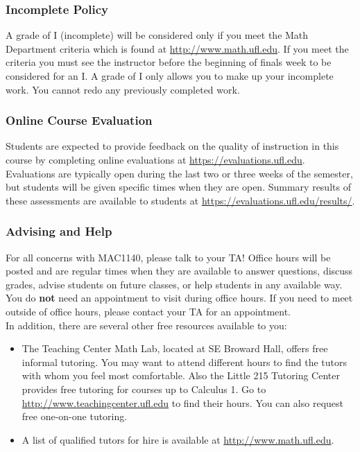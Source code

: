 \documentclass{ximera}
\begin{document}
\subsubsection*{Incomplete Policy}
    A grade of I (incomplete) will be considered only if you meet the Math Department criteria which is found at \url{http://www.math.ufl.edu}.  If you meet the criteria you must see the instructor before the beginning of finals week to be considered for an I.  A grade of I only allows you to make up your incomplete work. You cannot redo any previously completed work.


\subsubsection*{Online Course Evaluation}
    Students are expected to provide feedback on the quality of instruction in this course by completing online evaluations at \url{https://evaluations.ufl.edu}. Evaluations are typically open during the last two or three weeks of the semester, but students will be given specific times when they are open. Summary results of these assessments are available to students at \url{https://evaluations.ufl.edu/results/}.

\subsubsection*{Advising and Help}  %
    For all concerns with MAC1140, please talk to your TA!  Office hours will be posted and are regular times when they are available to answer questions, discuss grades, advise students on future classes, or help students in any available way. You do \textbf{not} need an appointment to visit during office hours. If you need to meet outside of office hours, please contact your TA for an appointment. \\


    \noindent In addition, there are several other free resources available to you:
    \begin{itemize}
        \item The Teaching Center Math Lab, located at SE Broward Hall, offers free informal tutoring. You may want to attend different hours to find the tutors with whom you feel most comfortable.  Also the Little 215 Tutoring Center provides free tutoring for courses up to Calculus 1.  Go to \url{http://www.teachingcenter.ufl.edu} to find their hours. You can also request free one-on-one tutoring.
    
        \item A list of qualified tutors for hire is available at \url{http://www.math.ufl.edu}.
    \end{itemize}
\end{document}
